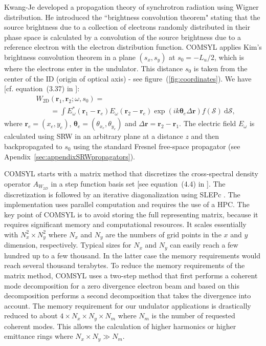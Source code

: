 \documentclass{iucr}              %
\begin{document}
Kwang-Je  developed a propagation theory of synchrotron radiation using Wigner distribution. He introduced the ``brightness convolution theorem" stating that the source brightness due to a collection of electrons randomly distributed in their phase space is calculated by a convolution of the source brightness due to a reference electron with the electron distribution function. 
COMSYL applies Kim's brightness convolution theorem in a plane $(s_x,s_y)$ at $s_0=-L_u\big/2$, which is where the  electrons enter in the undulator. This distance $s_0$ is taken from the center of the ID (origin of optical axis) - see figure~(\ref{fig:coordinates}). We have [cf. equation~(3.37) in \cite{glassThesis}]:
\begin{equation}\label{eq:comsyl_W2D}
\begin{split}
& W_\text{2D}(\textbf{r}_1,\textbf{r}_2;\omega,s_0) = \\
&\qquad=\int E_\omega^*(\textbf{r}_1-\textbf{r}_e)
    E_\omega(\textbf{r}_2-\textbf{r}_e) \exp(i k \mathbf{\theta}_e\Delta\textbf{r})f(\mathcal{S})~\text{d}\mathcal{S},
\end{split}
\end{equation}
where $\textbf{r}_e=(x_e,y_e)$, $\mathbf{\theta}_e=(\theta_{x_e},\theta_{y_e})$ and $\Delta\textbf{r}=\textbf{r}_2-\textbf{r}_1$. The electric field $E_\omega$ is calculated using SRW in an arbitrary plane at a distance $z$ and then backpropagated to $s_0$ using the standard Fresnel free-space propagator (see Apendix~\ref{sec:appendixSRWpropagators}).

COMSYL starts with a matrix method that discretizes the cross-spectral density operator $A_{W_{2D}}$ in a step function basis set [see equation~(4.4) in \cite{glassThesis}]. The discretization is followed by an iterative diagonalization using SLEPc \cite{SLEPc}. The implementation uses parallel computation and requires the use of a HPC. The key point of COMSYL is to avoid storing the full representing matrix, because it requires significant memory and computational resources. It scales essentially with $N_x^2 \times N_y^2$ where $N_x$ and $N_y$ are the numbers of grid points in the $x$ and $y$ dimension, respectively. Typical sizes for $N_x$ and $N_y$ can easily reach a few hundred up to a few thousand. In the latter case the memory requirements would reach several thousand terabytes. To reduce the memory requirements of the matrix method, COMSYL uses a two-step method that first performs a coherent mode decomposition for a zero divergence electron beam and based on this decomposition performs a second decomposition that takes the divergence into account. The memory requirement for our undulator applications is drastically reduced to about $4 \times N_x \times N_y \times N_m$ where $N_m$ is the number of requested coherent modes. This allows the calculation of higher harmonics or higher emittance rings where $N_x \times N_y \gg N_m$. 
\end{document}

